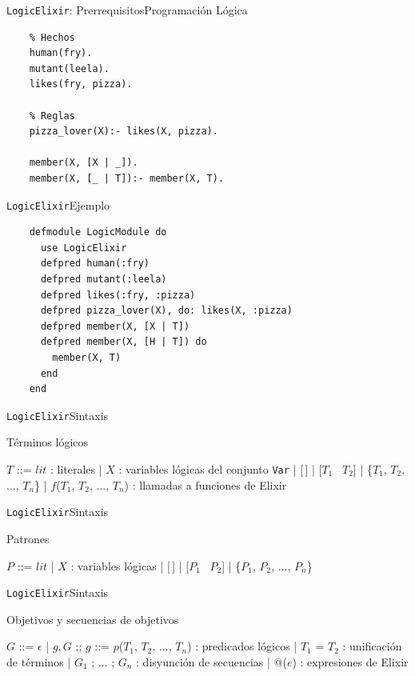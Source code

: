 \documentclass[14pt,aspectratio=169]{beamer}
\begin{document}
\begin{frame}[fragile]{\texttt{LogicElixir}: Prerrequisitos}{Programación Lógica}
  \begin{verbatim}
    % Hechos
    human(fry).
    mutant(leela).
    likes(fry, pizza).

    % Reglas
    pizza_lover(X):- likes(X, pizza).

    member(X, [X | _]).
    member(X, [_ | T]):- member(X, T).

  \end{verbatim}
\end{frame}

\begin{frame}[fragile]{\texttt{LogicElixir}}{Ejemplo}
  \small \begin{verbatim}
    defmodule LogicModule do
      use LogicElixir
      defpred human(:fry)
      defpred mutant(:leela)
      defpred likes(:fry, :pizza)
      defpred pizza_lover(X), do: likes(X, :pizza)
      defpred member(X, [X | T])
      defpred member(X, [H | T]) do
        member(X, T)
      end
    end
  \end{verbatim}
\end{frame}

\begin{frame}{\texttt{LogicElixir}}{Sintaxis}
  \footnotesize \begin{block}{Términos lógicos}
    \begin{bnfgrammar}
      $T$ ::= $lit$ : literales
        | $X$ : variables lógicas del conjunto \texttt{Var}
        | [\,]
        | [$T_1$ \textbar\ $T_2$]
        | \{$T_1$, $T_2$, ..., $T_n$\}
        | $f$($T_1$, $T_2$, ..., $T_n$) : llamadas a funciones de Elixir
    \end{bnfgrammar}
  \end{block}
\end{frame}

\begin{frame}{\texttt{LogicElixir}}{Sintaxis}
  \begin{block}{Patrones}
    \begin{bnfgrammar}
      $P$ ::= $lit$
      | $X$ : variables lógicas
      | [\,]
      | [$P_1$ \textbar\ $P_2$]
      | \{$P_1$, $P_2$, ..., $P_n$\}
    \end{bnfgrammar}
  \end{block}
\end{frame}

\begin{frame}{\texttt{LogicElixir}}{Sintaxis}
  \footnotesize \begin{block}{Objetivos y secuencias de objetivos}
    \begin{bnfgrammar}
      $G$ ::= $\epsilon$ | $g, G$
    ;;
      $g$ ::= $p$($T_1$, $T_2$, ..., $T_n$) : predicados lógicos
          | $T_1$ = $T_2$ : unificación de términos
          | $G_1$ ; ... ; $G_n$ : disyunción de secuencias
          | $@$($e$) : expresiones de Elixir
    \end{bnfgrammar}
  \end{block}
\end{frame}
\end{document}
